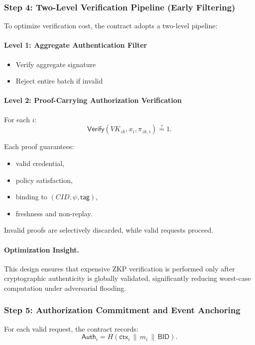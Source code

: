\documentclass[conference]{IEEEtran}
\begin{document}
\subsubsection*{Step 4: Two-Level Verification Pipeline (Early Filtering)}

To optimize verification cost, the contract adopts a two-level pipeline:

\paragraph{Level 1: Aggregate Authentication Filter}
\begin{itemize}
    \item Verify aggregate signature
    \item Reject entire batch if invalid
\end{itemize}

\paragraph{Level 2: Proof-Carrying Authorization Verification}
For each $i$:
\[
\textsf{Verify}(VK_{zk}, x_i, \pi_{zk,i}) \stackrel{?}{=} 1.
\]

Each proof guarantees:
\begin{itemize}
    \item valid credential,
    \item policy satisfaction,
    \item binding to $(CID, \psi, \mathsf{tag})$,
    \item freshness and non-replay.
\end{itemize}

Invalid proofs are selectively discarded, while valid requests proceed.

\paragraph{Optimization Insight.}
This design ensures that expensive ZKP verification is performed only after cryptographic authenticity is globally validated, significantly reducing worst-case computation under adversarial flooding.

\subsubsection*{Step 5: Authorization Commitment and Event Anchoring}

For each valid request, the contract records:
\[
\textsf{Auth}_i = H(\mathsf{ctx}_i \,\|\, m_i \,\|\, \mathsf{BID}).
\]
\end{document}
